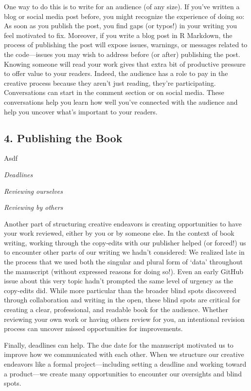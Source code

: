 \documentclass[
  english,
  man]{apa6}
\begin{document}
One way to do this is to write for an audience (of any size). If you've written a blog or social media post before, you might recognize the experience of doing so: As soon as you publish the post, you find gaps (or typos!) in your writing you feel motivated to fix. Moreover, if you write a blog post in R Markdown, the process of publishing the post will expose issues, warnings, or messages related to the code---issues you may wish to address before (or after) publishing the post. Knowing someone will read your work gives that extra bit of productive pressure to offer value to your readers. Indeed, the audience has a role to pay in the creative process because they aren't just reading, they're participating. Conversations can start in the comment section or on social media. These conversations help you learn how well you've connected with the audience and help you uncover what's important to your readers.

\hypertarget{publishing-the-book}{%
\subsection{4. Publishing the Book}\label{publishing-the-book}}

Asdf

\emph{Deadlines}

\emph{Reviewing ourselves}

\emph{Reviewing by others}

Another part of structuring creative endeavors is creating opportunities to have your work reviewed, either by you or by someone else. In the context of book writing, working through the copy-edits with our publisher helped (or forced!) us to encounter other parts of our writing we hadn't considered: We realized late in the process that we used both the singular and plural form of `data' throughout the manuscript (without expressed reasons for doing so!). Even an early GitHub issue about this very topic hadn't prompted the same level of urgency as the copy-edits did. While more particular than the broader blind spots discovered through collaboration and writing in the open, these blind spots are critical for creating a clear, professional, and readable book for the audience. Whether reviewing your own work or having others review for you, an intentional revision process can uncover missed opportunities for improvements.

Finally, deadlines can help. The due date for the manuscript motivated us to improve how we communicated with each other. When we structure our creative endeavors like a formal project---including setting a deadline and working toward a product---we create many opportunities to encounter our oversights and blind spots.
\end{document}

